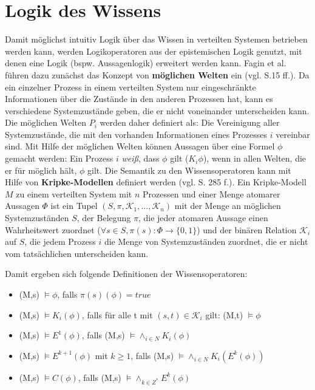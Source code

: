 \section{Logik des Wissens}
\label{Logik}
Damit möglichst intuitiv Logik über das Wissen in verteilten Systemen betrieben werden kann, werden Logikoperatoren aus der epistemischen Logik genutzt, mit denen eine Logik (bspw. Aussagenlogik) erweitert werden kann. 
Fagin et al. führen dazu zunächst das Konzept von \textbf{möglichen Welten} ein (vgl. \cite{fagin2003reasoning} S.15 ff.). 
Da ein einzelner Prozess in einem verteilten System nur eingeschränkte Informationen über die Zustände in den anderen Prozessen hat, kann es verschiedene Systemzustände geben, die er nicht voneinander unterscheiden kann. Die möglichen Welten $P_i$ werden daher definiert als: Die Vereinigung aller Systemzustände, die mit den vorhanden Informationen eines Prozesses $i$ vereinbar sind.
Mit Hilfe der möglichen Welten können Aussagen über eine Formel $\phi$ gemacht werden:
Ein Prozess $i$ \textit{weiß}, dass $\phi$ gilt ($K_i\phi$), wenn in allen Welten, die er für möglich hält, $\phi$ gilt.
Die Semantik zu den Wissensoperatoren kann mit Hilfe von \textbf{Kripke-Modellen} definiert werden (vgl. \cite{kshemkalyani2011distributed} S. 285 f.).
Ein Kripke-Modell $M$ zu einem verteilten System mit $n$ Prozessen und einer Menge atomarer Aussagen $\Phi$ ist ein Tupel $(S,\pi,\mathcal{K}_1,...,\mathcal{K}_n)$ mit der Menge an möglichen Systemzuständen $S$, der Belegung $\pi$, die jeder atomaren Aussage einen Wahrheitswert zuordnet ($\forall s\in S, \pi(s):\Phi \rightarrow \{0,1\}$) und der binären Relation $\mathcal{K}_i$ auf $S$, die jedem Prozess $i$ die Menge von Systemzuständen zuordnet, die er nicht vom tatsächlichen unterscheiden kann.\medskip

Damit ergeben sich folgende Definitionen der Wissensoperatoren:
\begin{itemize}
\item (M,s) $\vDash \phi$, falls $\pi(s)(\phi) = true$
\item (M,s) $\vDash K_i(\phi)$, falls für alle t mit $(s,t) \in \mathcal{K}_i $ gilt: (M,t) $\vDash \phi$
\item (M,s) $\vDash E^1(\phi)$, falls (M,s) $\vDash\land_{i\in N}K_i(\phi)$
\item (M,s) $\vDash E^{k+1}(\phi)$ mit $k\ge 1$, falls (M,s) $\vDash\land_{i\in N}K_i(E^k(\phi))$
\item (M,s) $\vDash C(\phi)$, falls (M,s) $\vDash\land_{k\in Z^*}E^k(\phi)$
\end{itemize}

